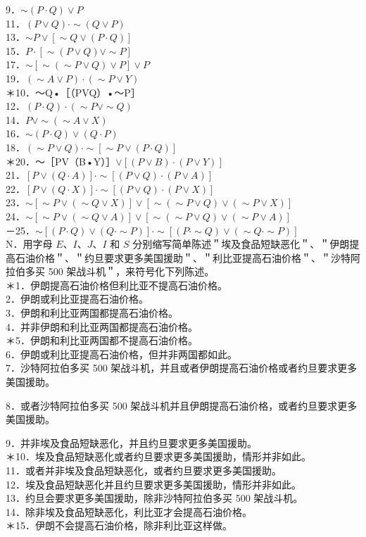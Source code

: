 9．$\sim(P \cdot Q) \vee P$\\
11．$(P \vee Q) \cdot \sim(Q \vee P)$\\
13．$\sim P \vee[\sim Q \vee(P \cdot Q)]$\\
15．$P \cdot[\sim(P \vee Q) \vee \sim P]$\\
17．$\sim[\sim(\sim P \vee Q) \vee P] \vee P$\\
19．$(\sim A \vee P) \cdot(\sim P \vee Y)$\\
＊10．～Q•［（PVQ）•～P］\\
12．$(P \cdot Q) \cdot(\sim P \vee \sim Q)$\\
14．$P \vee \sim(\sim A \vee X)$\\
16．$\sim(P \cdot Q) \vee(Q \cdot P)$\\
18．$(\sim P \vee Q) \cdot \sim[\sim P \vee(P \cdot Q)]$\\
＊20．～［PV（B•Y）］$\vee[(P \vee B) \cdot(P \vee Y)]$\\
21．$[P \vee(Q \cdot A)] \cdot \sim[(P \vee Q) \cdot(P \vee A)]$\\
22．$[P \vee(Q \cdot X)] \cdot \sim[(P \vee Q) \cdot(P \vee X)]$\\
23．$\sim[\sim P \vee(\sim Q \vee X)] \vee[\sim(\sim P \vee Q) \vee(\sim P \vee X)]$\\
24．$\sim[\sim P \vee(\sim Q \vee A)] \vee[\sim(\sim P \vee Q) \vee(\sim P \vee A)]$\\
－25．$\sim[(P \cdot Q) \vee(Q \cdot \sim P)] \cdot \sim[(P \cdot \sim Q) \vee(\sim Q \cdot \sim P)]$\\
N．用字母 $E 、 I 、 J 、 I$ 和 $S$ 分别缩写简单陈述＂埃及食品短缺恶化＂、＂伊朗提高石油价格＂、＂约旦要求更多美国援助＂、＂利比亚提高石油价格＂、＂沙特阿拉伯多买 500 架战斗机＂，来符号化下列陈述。\\
＊1．伊朗提高石油价格但利比亚不提高石油价格。\\
2．伊朗或利比亚提高石油价格。\\
3．伊朗和利比亚两国都提高石油价格。\\
4．并非伊朗和利比亚两国都提高石油价格。\\
＊5．伊朗和利比亚两国都不提高石油价格。\\
6．伊朗或利比亚提高石油价格，但并非两国都如此。\\
7．沙特阿拉伯多买 500 架战斗机，并且或者伊朗提高石油价格或者约旦要求更多美国援助。

8．或者沙特阿拉伯多买 500 架战斗机并且伊朗提高石油价格，或者约旦要求更多美国援助。

9．并非埃及食品短缺恶化，并且约旦要求更多美国援助。\\
＊10．埃及食品短缺恶化或者约旦要求更多美国援助，情形并非如此。\\
11．或者并非埃及食品短缺恶化，或者约旦要求更多美国援助。\\
12．埃及食品短缺恶化并且约旦要求更多美国援助，情形并非如此。\\
13．约旦会要求更多美国援助，除非沙特阿拉伯多买 500 架战斗机。\\
14．除非埃及食品短缺恶化，利比亚才会提高石油价格。\\
＊15．伊朗不会提高石油价格，除非利比亚这样做。

